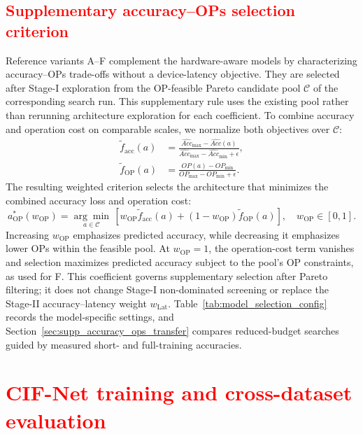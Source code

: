 \documentclass[preprint,review,12p,times]{elsarticle}
\begin{document}
\subsection{\textcolor{red}{Supplementary accuracy--OPs selection criterion}}
\label{sec:supp_ops_selection}

\begingroup
\color{red}
Reference variants A--F complement the hardware-aware models by characterizing accuracy--OPs trade-offs without a device-latency objective. They are selected after Stage-I exploration from the OP-feasible Pareto candidate pool $\mathcal C$ of the corresponding search run. This supplementary rule uses the existing pool rather than rerunning architecture exploration for each coefficient. To combine accuracy and operation cost on comparable scales, we normalize both objectives over $\mathcal C$:
\begin{align}
\widetilde f_{\mathrm{acc}}(a)
&=\frac{\widehat{Acc}_{\max}-\widehat{Acc}(a)}
{\widehat{Acc}_{\max}-\widehat{Acc}_{\min}+\epsilon},\\
\widetilde f_{\mathrm{OP}}(a)
&=\frac{OP(a)-OP_{\min}}{OP_{\max}-OP_{\min}+\epsilon}.
\end{align}
The resulting weighted criterion selects the architecture that minimizes the combined accuracy loss and operation cost:
\begin{equation}
a^*_{\mathrm{OP}}(w_{\mathrm{OP}})
=\underset{a\in\mathcal C}{\arg\min}\,
\left[w_{\mathrm{OP}}\widetilde f_{\mathrm{acc}}(a)
+(1-w_{\mathrm{OP}})\widetilde f_{\mathrm{OP}}(a)\right],
\quad w_{\mathrm{OP}}\in[0,1].
\label{eq:supp_ops_selection}
\end{equation}
Increasing $w_{\mathrm{OP}}$ emphasizes predicted accuracy, while decreasing it emphasizes lower OPs within the feasible pool. At $w_{\mathrm{OP}}=1$, the operation-cost term vanishes and selection maximizes predicted accuracy subject to the pool's OP constraints, as used for F. This coefficient governs supplementary selection after Pareto filtering; it does not change Stage-I non-dominated screening or replace the Stage-II accuracy--latency weight $w_{\mathrm{Lat}}$. Table~\ref{tab:model_selection_config} records the model-specific settings, and Section~\ref{sec:supp_accuracy_ops_transfer} compares reduced-budget searches guided by measured short- and full-training accuracies.
\endgroup

\begingroup
\color{red}
\section{\textcolor{red}{CIF-Net training and cross-dataset evaluation}}
\end{document}
